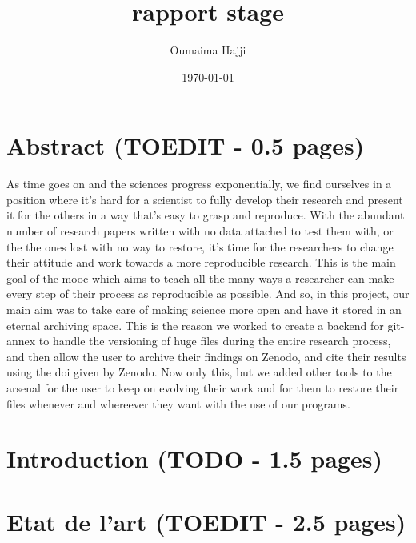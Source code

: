 \documentclass[11pt]{article}
\author{Oumaima Hajji}
\date{\today}
\title{rapport stage}
\begin{document}
\maketitle
\tableofcontents



\section{Abstract (TOEDIT - 0.5 pages)}
\label{sec:org646a383}
As time goes on and the sciences progress exponentially, we find
ourselves in a position where it's hard for a scientist to fully
develop their research and present it for the others in a way that's
easy to grasp and reproduce. With the abundant number of research
papers written with no data attached to test them with, or the the
ones lost with no way to restore, it's time for the researchers to
change their attitude and work towards a more reproducible
research. This is the main goal of the mooc which aims to teach all
the many ways a researcher can make every step of their process as
reproducible as possible. And so, in this project, our main aim was to
take care of making science more open and have it stored in an eternal
archiving space. This is the reason we worked to create a backend for
git-annex to handle the versioning of huge files during the entire research process, and
then allow the user to archive their findings on Zenodo, and cite
their results using the doi given by Zenodo. Now only this, but we
added other tools to the arsenal for the user to keep on evolving
their work and for them to restore their files whenever and whereever
they want with the use of our programs.  

\section{Introduction (TODO - 1.5 pages)}
\label{sec:org70ca2b1}
\section{Etat de l'art (TOEDIT - 2.5 pages)}
\label{sec:org05c7900}
\end{document}
